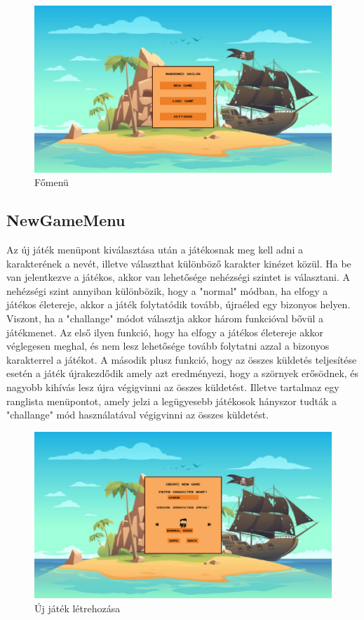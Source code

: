 \begin{figure}[H]
    \centering
    \includegraphics[width=14.0truecm]{images/mainmenu.png}
    \caption{Főmenü}
    \label{fig:Főmenü}
\end{figure}



\subsection{NewGameMenu}
Az új játék menüpont kiválasztása után a játékosnak meg kell adni a karakterének a nevét, illetve választhat különböző karakter kinézet közül. Ha be van jelentkezve a játékos, akkor van lehetősége nehézségi szintet is választani.
A nehézségi szint annyiban különbözik, hogy a "normal" módban, ha elfogy a játékos életereje, akkor a játék folytatódik tovább, újraéled egy bizonyos helyen. Viszont, ha a "challange"  módot választja akkor három funkcióval bővül a játékmenet. Az első ilyen funkció, hogy ha elfogy a játékos életereje akkor véglegesen meghal, és nem lesz lehetősége tovább folytatni azzal a bizonyos karakterrel a játékot. A második plusz funkció, hogy az összes küldetés teljesítése esetén a játék újrakezdődik amely azt eredményezi, hogy a szörnyek erősödnek, és nagyobb kihívás lesz újra végigvinni az összes küldetést. Illetve tartalmaz egy ranglista menüpontot, amely jelzi a legügyesebb játékosok hányszor tudták a "challange" mód használatával végigvinni az összes küldetést. 

\begin{figure}[H]
    \centering
    \includegraphics[width=14.0truecm]{images/newgame.png}
    \caption{Új játék létrehozása}
    \label{fig:Új játék létrehozása}
\end{figure}


